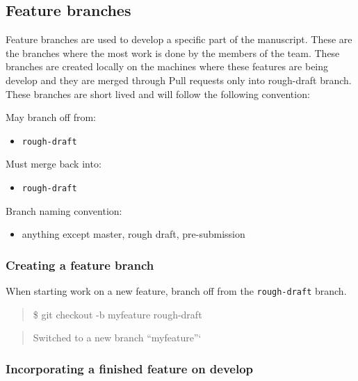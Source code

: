 \documentclass[]{book}
\providecommand{\tightlist}{%
  \setlength{\itemsep}{0pt}\setlength{\parskip}{0pt}}
\begin{document}
\subsection{Feature branches}\label{feature-branches}

Feature branches are used to develop a specific part of the manuscript.
These are the branches where the most work is done by the members of the
team. These branches are created locally on the machines where these
features are being develop and they are merged through Pull requests
only into rough-draft branch. These branches are short lived and will
follow the following convention:

May branch off from:

\begin{itemize}
\tightlist
\item
  \texttt{rough-draft}
\end{itemize}

Must merge back into:

\begin{itemize}
\tightlist
\item
  \texttt{rough-draft}
\end{itemize}

Branch naming convention:

\begin{itemize}
\tightlist
\item
  anything except master, rough draft, pre-submission
\end{itemize}

\subsubsection{Creating a feature
branch}\label{creating-a-feature-branch}

When starting work on a new feature, branch off from the
\texttt{rough-draft} branch.

\begin{quote}
\$ git checkout -b myfeature rough-draft
\end{quote}

\begin{quote}
Switched to a new branch ``myfeature''`
\end{quote}

\subsubsection{Incorporating a finished feature on
develop}\label{incorporating-a-finished-feature-on-develop}
\end{document}
